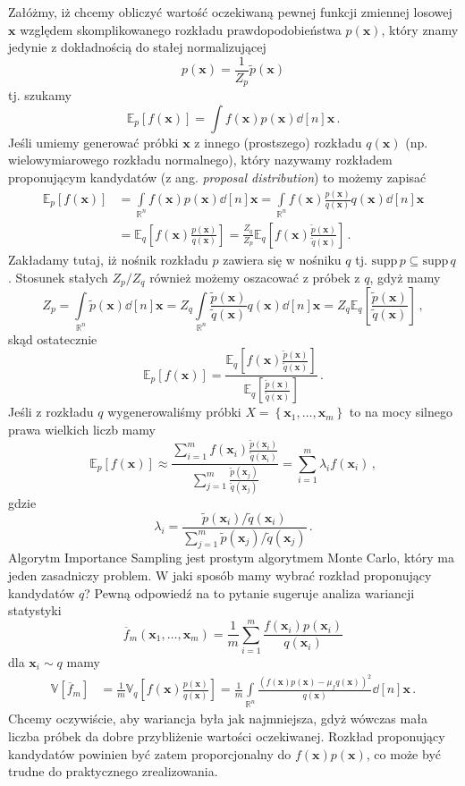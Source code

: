 \documentclass{myclass}
\numberwithin{equation}{subsection}
\begin{document}
Załóżmy, iż chcemy obliczyć wartość oczekiwaną pewnej funkcji zmiennej losowej \(\bm{x}\) względem
skomplikowanego rozkładu prawdopodobieństwa \(p(\bm{x})\), który znamy jedynie z dokładnością do
stałej normalizującej
\[
p(\bm{x}) = \frac{1}{Z_p}\tilde{p}(\bm{x})
\]
tj. szukamy
\[
\mathbb{E}_p[f(\bm{x})] = \int f(\bm{x}) p(\bm{x})\dd[n]\bm{x}\,.
\]
Jeśli umiemy generować próbki \(\bm{x}\) z innego (prostszego) rozkładu \(q(\bm{x})\) (np.
wielowymiarowego rozkładu normalnego), który nazywamy rozkładem proponującym kandydatów (z ang.
\textit{proposal distribution}) to możemy zapisać
\[
\begin{split}
\mathbb{E}_p[f(\bm{x})] &= \int\limits_{\mathbb{R}^n}f(\bm{x})p(\bm{x})\dd[n]\bm{x} = \int\limits_{\mathbb{R}^n}f(\bm{x})\frac{p(\bm{x})}{q(\bm{x})}q(\bm{x})\dd[n]\bm{x}\\
&=\mathbb{E}_q\left[f(\bm{x}) \frac{p(\bm{x})}{q(\bm{x})}\right] = \frac{Z_q}{Z_p}\mathbb{E}_q\left[f(\bm{x}) \frac{\tilde{p}(\bm{x})}{\tilde{q}(\bm{x})}\right]\,.
\end{split}
\]
Zakładamy tutaj, iż nośnik rozkładu \(p\) zawiera się w nośniku \(q\) tj. \(\text{supp}\,p \subseteq
\text{supp}\,q\). Stosunek stałych \(Z_p / Z_q\) również możemy oszacować z próbek z \(q\), gdyż
mamy
\[
Z_p = \int\limits_{\mathbb{R}^n}\tilde{p}(\bm{x})\dd[n]{\bm{x}} = Z_q\int\limits_{\mathbb{R}^n}\frac{\tilde{p}(\bm{x})}{\tilde{q}(\bm{x})} q(\bm{x})\dd[n]{\bm{x}} = Z_q \mathbb{E}_q\left[\frac{\tilde{p}(\bm{x})}{\tilde{q}(\bm{x})}\right]\,,
\]
skąd ostatecznie
\[
\mathbb{E}_p[f(\bm{x})] = \frac{\mathbb{E}_q\left[f(\bm{x}) \frac{\tilde{p}(\bm{x})}{\tilde{q}(\bm{x})}\right]}{\mathbb{E}_q\left[\frac{\tilde{p}(\bm{x})}{\tilde{q}(\bm{x})}\right]}\,.
\]
Jeśli z rozkładu \(q\) wygenerowaliśmy próbki \(X = \left\{\bm{x}_1,\ldots,\bm{x}_m\right\}\) to na
mocy silnego prawa wielkich liczb mamy
\[
\boxed{
\mathbb{E}_p[f(\bm{x})] \approx \frac{\sum_{i=1}^m f(\bm{x}_i) \frac{\tilde{p}(\bm{x}_i)}{\tilde{q}(\bm{x}_i)}}{\sum_{j=1}^m \frac{\tilde{p}(\bm{x}_j)}{\tilde{q}(\bm{x}_j)}} = \sum_{i=1}^m \lambda_i f(\bm{x}_i)\,,
}
\]
gdzie
\[
\boxed{
\lambda_i = \frac{\tilde{p}(\bm{x}_i) / \tilde{q}(\bm{x}_i)}{\sum_{j=1}^m \tilde{p}(\bm{x}_j) / \tilde{q}(\bm{x}_j) }\,.
}
\]
Algorytm Importance Sampling jest prostym algorytmem Monte Carlo, który ma jeden zasadniczy problem.
W jaki sposób mamy wybrać rozkład proponujący kandydatów \(q\)? Pewną odpowiedź na to pytanie
sugeruje analiza wariancji statystyki 
\[
\overline{f}_m(\bm{x}_1,\ldots,\bm{x}_m) = \frac{1}{m}\sum_{i=1}^m \frac{f(\bm{x}_i)p(\bm{x}_i)}{q(\bm{x}_i)}
\]
dla \(\bm{x}_i \sim q\) mamy
\[
\begin{split}
\mathbb{V}[\overline{f}_m] &= \frac{1}{m}\mathbb{V}_q\left[f(\bm{x})\frac{p(\bm{x})}{q(\bm{x})}\right] = \frac{1}{m}\int\limits_{\mathbb{R}^n}\frac{(f(\bm{x})p(\bm{x}) - \mu_fq(\bm{x}))^2}{q(\bm{x})}\dd[n]{\bm{x}}\,.
\end{split}
\]
Chcemy oczywiście, aby wariancja była jak najmniejsza, gdyż wówczas mała liczba próbek da dobre
przybliżenie wartości oczekiwanej. Rozkład proponujący kandydatów powinien być zatem proporcjonalny
do \(f(\bm{x})p(\bm{x})\), co może być trudne do praktycznego zrealizowania.
\end{document}
